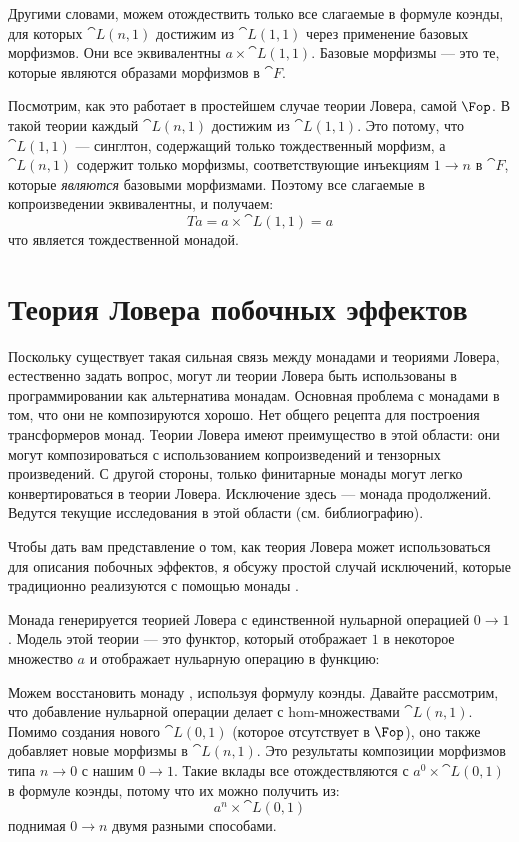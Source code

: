 Другими словами, можем отождествить только все слагаемые в формуле коэнды,
для которых $\cat{L}(n, 1)$ достижим из $\cat{L}(1, 1)$
через применение базовых морфизмов. Они все эквивалентны
$a \times \cat{L}(1, 1)$. Базовые морфизмы — это те, которые являются образами
морфизмов в $\cat{F}$.

Посмотрим, как это работает в простейшем случае теории Ловера, самой
$\Fop$. В такой теории каждый
$\cat{L}(n, 1)$ достижим из $\cat{L}(1, 1)$. Это потому, что
$\cat{L}(1, 1)$ — синглтон, содержащий только тождественный морфизм,
а $\cat{L}(n, 1)$ содержит только морфизмы, соответствующие
инъекциям $1 \to n$ в $\cat{F}$, которые \emph{являются}
базовыми морфизмами. Поэтому все слагаемые в копроизведении
эквивалентны, и получаем:
\[T a = a \times \cat{L}(1, 1) = a\]
что является тождественной монадой.

\section{Теория Ловера побочных эффектов}

Поскольку существует такая сильная связь между монадами и теориями
Ловера, естественно задать вопрос, могут ли теории Ловера быть
использованы в программировании как альтернатива монадам. Основная проблема с
монадами в том, что они не композируются хорошо. Нет общего рецепта для
построения трансформеров монад. Теории Ловера имеют преимущество в этой
области: они могут композироваться с использованием копроизведений и тензорных произведений. С
другой стороны, только финитарные монады могут легко конвертироваться в теории
Ловера. Исключение здесь — монада продолжений. Ведутся текущие
исследования в этой области (см. библиографию).

Чтобы дать вам представление о том, как теория Ловера может использоваться для описания побочных
эффектов, я обсужу простой случай исключений, которые
традиционно реализуются с помощью монады .

Монада  генерируется теорией Ловера с
единственной нульарной операцией $0 \to 1$. Модель этой
теории — это функтор, который отображает $1$ в некоторое множество $a$ и
отображает нульарную операцию в функцию:

Можем восстановить монаду , используя формулу коэнды. Давайте
рассмотрим, что добавление нульарной операции делает с hom-множествами
$\cat{L}(n, 1)$. Помимо создания нового $\cat{L}(0, 1)$ (которое
отсутствует в $\Fop$), оно также добавляет новые морфизмы
в $\cat{L}(n, 1)$. Это результаты композиции морфизмов
типа $n \to 0$ с нашим $0 \to 1$.
Такие вклады все отождествляются с $a^0 \times \cat{L}(0, 1)$ в
формуле коэнды, потому что их можно получить из:
\[a^n \times \cat{L}(0, 1)\]
поднимая $0 \to n$ двумя разными способами.

